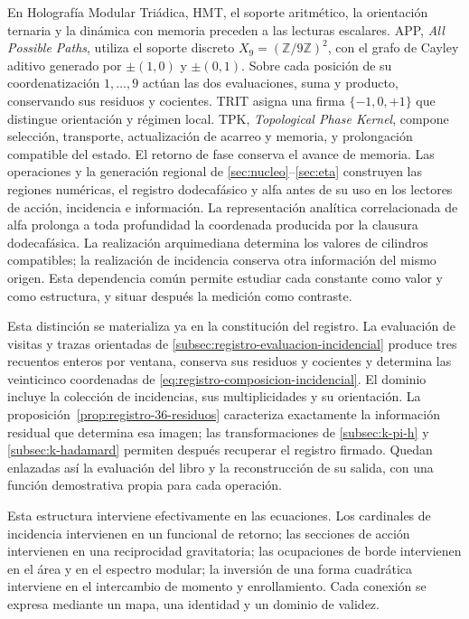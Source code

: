 En Holografía Modular Triádica, HMT, el soporte aritmético, la orientación
ternaria y la dinámica con memoria preceden a las lecturas escalares.
APP, \emph{All Possible Paths}, utiliza el soporte discreto
\(X_9=(\mathbb Z/9\mathbb Z)^2\), con el grafo de Cayley aditivo
generado por \(\pm(1,0)\) y \(\pm(0,1)\). Sobre cada posición
de su coordenatización \(1,\ldots,9\) actúan las dos evaluaciones, suma y
producto, conservando sus residuos y cocientes. TRIT asigna una firma
\(\{-1,0,+1\}\) que distingue orientación y régimen local.
TPK, \emph{Topological Phase Kernel}, compone selección, transporte,
actualización de acarreo y memoria, y prolongación compatible del estado.
El retorno de fase conserva el avance de memoria. Las operaciones y la
generación regional de \ref{sec:nucleo}--\ref{sec:eta} construyen las
regiones numéricas, el registro dodecafásico y alfa antes de su uso en
los lectores de acción, incidencia e información.
La representación analítica correlacionada de alfa prolonga a toda
profundidad la coordenada producida por la clausura dodecafásica.
La realización arquimediana determina los valores de cilindros compatibles;
la realización de incidencia conserva otra información del mismo origen.
Esta dependencia común permite estudiar cada constante como valor y
como estructura, y situar después la medición como contraste.

Esta distinción se materializa ya en la constitución del registro.
La evaluación de visitas y trazas orientadas de
\ref{subsec:registro-evaluacion-incidencial} produce tres recuentos enteros
por ventana, conserva sus residuos y cocientes y determina las veinticinco
coordenadas de \eqref{eq:registro-composicion-incidencial}. El dominio
incluye la colección de incidencias, sus multiplicidades y su orientación.
La proposición~\ref{prop:registro-36-residuos} caracteriza exactamente la
información residual que determina esa imagen; las transformaciones
de \ref{subsec:k-pi-h} y \ref{subsec:k-hadamard} permiten después recuperar
el registro firmado. Quedan enlazadas así la evaluación del libro y la
reconstrucción de su salida, con una función demostrativa propia para
cada operación.

Esta estructura interviene efectivamente en las ecuaciones.
Los cardinales de incidencia intervienen en
un funcional de retorno; las secciones de acción intervienen en una
reciprocidad gravitatoria; las ocupaciones de borde intervienen en el área
y en el espectro modular; la inversión de una forma cuadrática interviene
en el intercambio de momento y enrollamiento. Cada conexión se expresa
mediante un mapa, una identidad y un dominio de validez.


